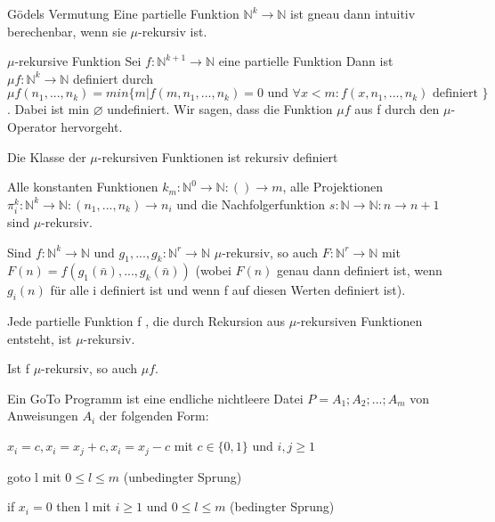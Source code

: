 \documentclass[avery5371, frame]{flashcards}
\begin{document}
\begin{flashcard}[Definition]{ Gödels Vermutung}
    Eine partielle Funktion $\mathbb{N}^k\rightarrow\mathbb{N}$ ist gneau dann intuitiv berechenbar, wenn sie $\mu$-rekursiv ist.
\end{flashcard}

\begin{flashcard}[Definition]{$\mu$-rekursive Funktion}
    Sei $f:\mathbb{N}^{k+1}\rightarrow\mathbb{N}$ eine partielle Funktion Dann ist $\mu f:\mathbb{N}^k\rightarrow\mathbb{N}$ definiert durch $\mu f(n_1,...,n_k)= min\{m| f(m,n_1,...,n_k)=0 \text{ und } \forall x< m: f(x,n_1,...,n_k) \text{ definiert } \}$. Dabei ist min $\varnothing$ undefiniert. Wir sagen, dass die Funktion $\mu f$ aus f durch den $\mu$-Operator hervorgeht.
\end{flashcard}

\begin{flashcard}[Definition]{Die Klasse der $\mu$-rekursiven Funktionen ist rekursiv definiert}
    \scriptsize{
        \begin{itemize*}
            \item Alle konstanten Funktionen $k_m:\mathbb{N}^0\rightarrow\mathbb{N}:()\rightarrow m$, alle Projektionen $\pi_i^k:\mathbb{N}^k\rightarrow \mathbb{N}: (n_1,...,n_k)\rightarrow n_i$ und die Nachfolgerfunktion $s:\mathbb{N}\rightarrow \mathbb{N}:n\rightarrow n+1$ sind $\mu$-rekursiv.
            \item Sind $f:\mathbb{N}^k \rightarrow \mathbb{N}$ und $g_1,...,g_k:\mathbb{N}^r\rightarrow\mathbb{N}$ $\mu$-rekursiv, so auch $F:\mathbb{N}^r\rightarrow\mathbb{N}$ mit $F(n) = f(g_1(\bar{n}),..., g_k(\bar{n}))$ (wobei $F(n)$ genau dann definiert ist, wenn $g_i(n)$ für alle i definiert ist und wenn f auf diesen Werten definiert ist).
            \item Jede partielle Funktion f , die durch Rekursion aus $\mu$-rekursiven Funktionen entsteht, ist $\mu$-rekursiv.
            \item Ist f $\mu$-rekursiv, so auch $\mu f$.
        \end{itemize*}
    }
\end{flashcard}

\begin{flashcard}[Definition]{Ein GoTo Programm}
    ist eine endliche nichtleere Datei $P=A_1;A_2;...;A_m$ von Anweisungen $A_i$ der folgenden Form:
    \begin{itemize*}
        \item $x_i=c, x_i=x_j+c, x_i=x_j-c$ mit $c\in\{0,1\}$ und $i,j\geq 1$
        \item goto l mit $0\leq l\leq m$ (unbedingter Sprung)
        \item if $x_i=0$ then l mit $i\geq 1$ und $0\leq l \leq m$ (bedingter Sprung)
    \end{itemize*}
\end{flashcard}
\end{document}
